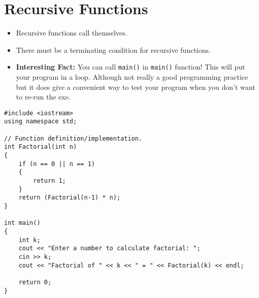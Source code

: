 \documentclass[12pt,a4paper]{article}
\begin{document}
\section{Recursive Functions}
\begin{itemize}
\item Recursive functions call themselves.
\item There must be a terminating condition for recursive functions.
\item \textbf{Interesting Fact:} You can call \verb|main()| in \verb|main()| function! This will put your program in a loop. Although not really a good programming practice but it does give a convenient way to test your program when you don't want to re-run the exe.
\end{itemize}
\begin{lstlisting}[caption={Recursive Factorial Function}]
#include <iostream>
using namespace std;

// Function definition/implementation.
int Factorial(int n)
{
	if (n == 0 || n == 1)
	{
		return 1;
	}
	return (Factorial(n-1) * n);
}

int main()
{
	int k;
	cout << "Enter a number to calculate factorial: ";
	cin >> k;
	cout << "Factorial of " << k << " = " << Factorial(k) << endl;
	
	return 0;
}
\end{lstlisting}
\end{document}
